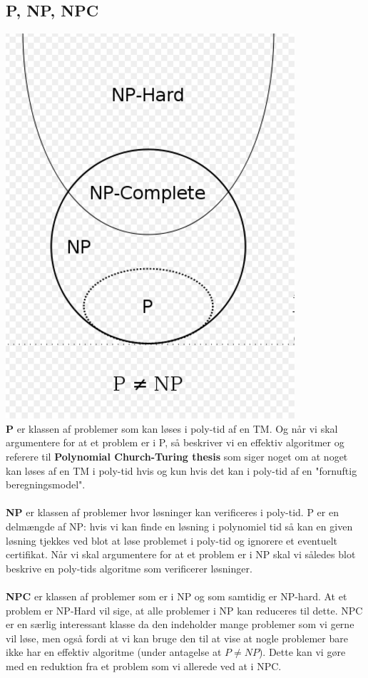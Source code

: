 \documentclass{article}
\begin{document}
\subsection{P, NP, NPC}
\includegraphics[scale=0.5]{asd.PNG}\\
\textbf{P} er klassen af problemer som kan løses i poly-tid af en TM. Og når vi skal argumentere for at et problem er i P, så beskriver vi en effektiv algoritmer og referere til \textbf{Polynomial Church-Turing thesis} som siger noget om at noget kan løses af en TM i poly-tid hvis og kun hvis det kan i poly-tid af en "fornuftig beregningsmodel". \\\\
\textbf{NP} er klassen af problemer hvor løsninger kan verificeres i poly-tid. P er en delmængde af NP: hvis vi kan finde en løsning i polynomiel tid så kan en given løsning tjekkes ved blot at løse problemet i poly-tid og ignorere et eventuelt certifikat. Når vi skal argumentere for at et problem er i NP skal vi således blot beskrive en poly-tids algoritme som verificerer løsninger.\\\\
\textbf{NPC} er klassen af problemer som er i NP og som samtidig er NP-hard. At et problem er NP-Hard vil sige, at alle problemer i NP kan reduceres til dette. NPC er en særlig interessant klasse da den indeholder mange problemer som vi gerne vil løse, men også fordi at vi kan bruge den til at vise at nogle problemer bare ikke har en effektiv algoritme (under antagelse at $P\ne NP$). Dette kan vi gøre med en reduktion fra et problem som vi allerede ved at i NPC. 
\end{document}
